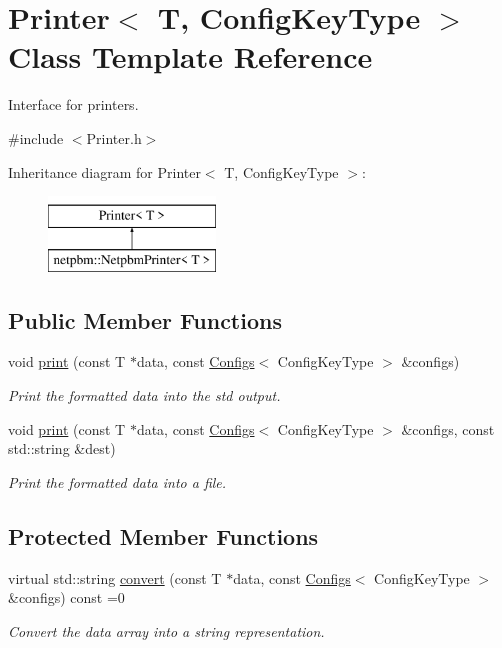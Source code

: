 \hypertarget{class_printer}{}\section{Printer$<$ T, Config\+Key\+Type $>$ Class Template Reference}
\label{class_printer}


Interface for printers.  




{\ttfamily \#include $<$Printer.\+h$>$}

Inheritance diagram for Printer$<$ T, Config\+Key\+Type $>$\+:\begin{figure}[H]
\begin{center}
\leavevmode
\includegraphics[height=2.000000cm]{class_printer}
\end{center}
\end{figure}
\subsection*{Public Member Functions}
\begin{DoxyCompactItemize}
\item 
void \mbox{\hyperlink{class_printer_a593e70d807258eefa413a52cd8e3c9ee}{print}} (const T $\ast$data, const \mbox{\hyperlink{class_configs}{Configs}}$<$ Config\+Key\+Type $>$ \&configs)
\begin{DoxyCompactList}\small\item\em Print the formatted data into the std output. \end{DoxyCompactList}\item 
void \mbox{\hyperlink{class_printer_a726243ffd10cdc4c706767513c175a1b}{print}} (const T $\ast$data, const \mbox{\hyperlink{class_configs}{Configs}}$<$ Config\+Key\+Type $>$ \&configs, const std\+::string \&dest)
\begin{DoxyCompactList}\small\item\em Print the formatted data into a file. \end{DoxyCompactList}\end{DoxyCompactItemize}
\subsection*{Protected Member Functions}
\begin{DoxyCompactItemize}
\item 
virtual std\+::string \mbox{\hyperlink{class_printer_a76931150a7fb3d4a69c3483bd08eed17}{convert}} (const T $\ast$data, const \mbox{\hyperlink{class_configs}{Configs}}$<$ Config\+Key\+Type $>$ \&configs) const =0
\begin{DoxyCompactList}\small\item\em Convert the data array into a string representation. \end{DoxyCompactList}\end{DoxyCompactItemize}


